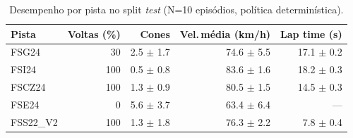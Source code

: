 \begin{table}[H]
\centering
\caption{Desempenho por pista no split \textit{test} (N=10 episódios, política determinística).}
\label{tab:per_track_test}
\begin{tabular}{lrrrr}
\toprule
\textbf{Pista} & \textbf{Voltas (\%)} & \textbf{Cones} & \textbf{Vel.\,m\'edia (km/h)} & \textbf{Lap time (s)} \\
\midrule
FSG24 & 30 & 2.5 $\pm$ 1.7 & 74.6 $\pm$ 5.5 & 17.1 $\pm$ 0.2 \\
FSI24 & 100 & 0.5 $\pm$ 0.8 & 83.6 $\pm$ 1.6 & 18.2 $\pm$ 0.3 \\
FSCZ24 & 100 & 1.3 $\pm$ 0.9 & 80.5 $\pm$ 1.5 & 14.5 $\pm$ 0.3 \\
FSE24 & 0 & 5.6 $\pm$ 3.7 & 63.4 $\pm$ 6.4 & --- \\
FSS22_V2 & 100 & 1.3 $\pm$ 1.8 & 76.3 $\pm$ 2.2 & 7.8 $\pm$ 0.4 \\
\bottomrule
\end{tabular}
\end{table}
